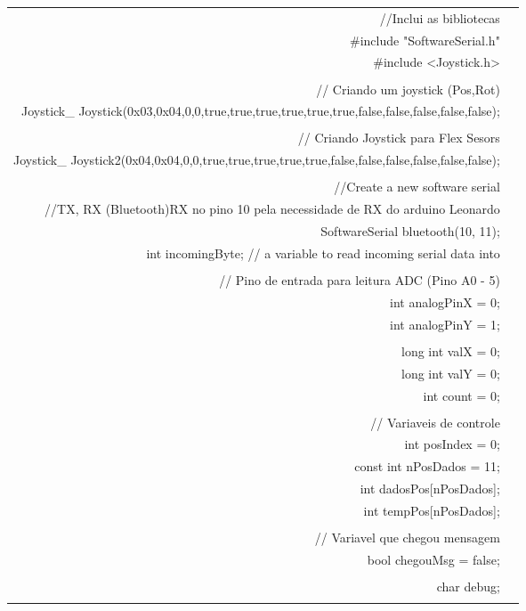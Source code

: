 \begin{longtable}{Rp{15cm}}
 \hline

//Inclui as bibliotecas\\
\#include "SoftwareSerial.h"\\
\#include <Joystick.h> \\
\\
// Criando um joystick (Pos,Rot) \\
Joystick\_ Joystick(0x03,0x04,0,0,true,true,true,true,true,true,false,false,false,false,false);\\
\\
// Criando Joystick para Flex Sesors\\
Joystick\_ Joystick2(0x04,0x04,0,0,true,true,true,true,true,false,false,false,false,false,false);\\
\\
//Create a new software  serial \\
//TX, RX (Bluetooth){RX no pino 10 pela necessidade de RX do arduino Leonardo}\\
SoftwareSerial bluetooth(10, 11);  \\
int incomingByte;      // a variable to read incoming serial data into \\
\\
// Pino de entrada para leitura ADC (Pino A0 - 5) \\
int analogPinX = 0; \\
int analogPinY = 1; \\
\\
long int valX = 0; \\
long int valY = 0; \\
int count = 0; \\
\\
// Variaveis de controle \\
int posIndex = 0; \\
const int nPosDados = 11; \\
int dadosPos[nPosDados]; \\
int tempPos[nPosDados]; \\
\\
// Variavel que chegou mensagem \\
bool chegouMsg = false; \\
\\
char debug; \\
\\

\end{longtable}
